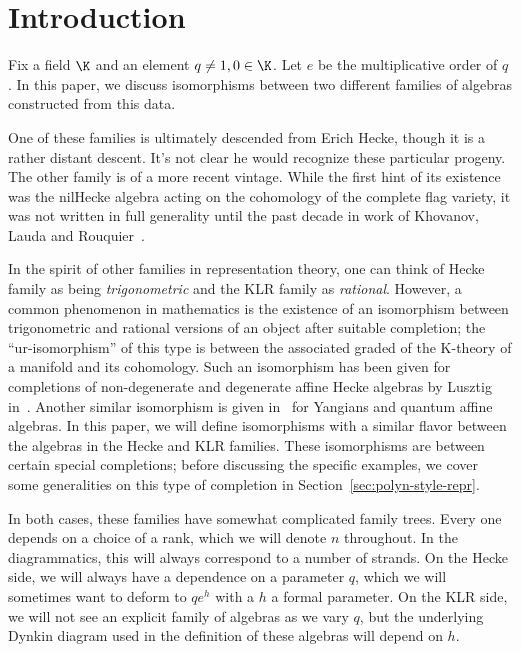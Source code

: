 \section{Introduction}
\label{sec:introduction}


Fix a field $\K$ and an element $q\neq 1,0\in \K$. Let
$e$ be the multiplicative order of $q$. In this paper, we
discuss isomorphisms between two different families of algebras
constructed from this data.

One of these families is
ultimately descended from Erich Hecke, though it is a rather distant
descent. It's not clear he would recognize these particular progeny.
The other family is of a more recent vintage. While the first hint of
its existence was the nilHecke algebra acting on the cohomology of the
complete flag variety, it was not written in full generality until the
past decade in work of Khovanov, Lauda and Rouquier~\cite{KLI,KLII,Rou2KM}. 

In the spirit of
other families in representation theory, one can think of Hecke family
as being \emph{trigonometric} and the KLR family as \emph{rational}. However, a common phenomenon
in mathematics is the existence of an isomorphism between
trigonometric and rational versions of an object after suitable completion; the
``ur-isomorphism'' of this type is between the associated graded of
the K-theory of a manifold and its cohomology. Such an isomorphism
has been given for completions of non-degenerate and degenerate affine
Hecke algebras by Lusztig in~\cite{Lusgraded}. Another similar
isomorphism is given in~\cite{GTL} for Yangians and quantum affine
algebras. In this paper, we will define isomorphisms with a similar
flavor between the algebras in the Hecke and KLR families. These
isomorphisms are between certain special completions; before
discussing the specific examples, we cover some generalities on this
type of completion in Section~\ref{sec:polyn-style-repr}.

In both cases, these families have somewhat complicated family
trees. Every one depends on a choice of a rank, which we will denote $n$
throughout. In the diagrammatics, this will always correspond to a
number of strands. On the Hecke side, we will always have a dependence
on a parameter $q$, which we will sometimes want to deform to $qe^h$
with a $h$ a formal parameter. On the KLR side, we will not see an
explicit family of algebras as we vary $q$, but the underlying
Dynkin diagram used in the definition of these algebras will depend on $h$. 

